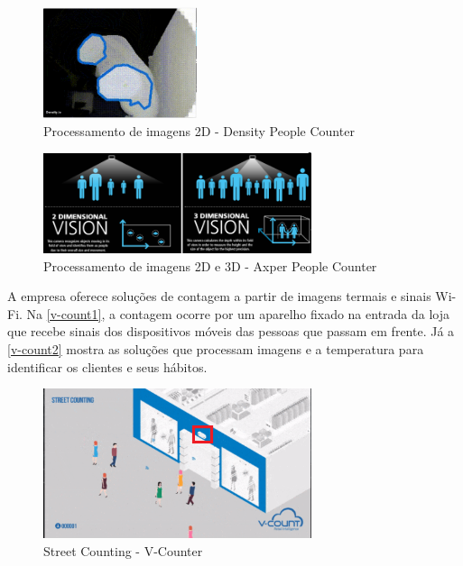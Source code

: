 \begin{figure}[htb]
  \caption{\label{density}Processamento de imagens 2D - Density People Counter}
  \begin{center}
    \includegraphics[width=0.40\textwidth]{img/density.png}
  \end{center}
\end{figure}

\begin{figure}[htb]
  \caption{\label{axper}Processamento de imagens 2D e 3D - Axper People Counter}
  \begin{center}
    \includegraphics[width=0.70\textwidth]{img/axper.png}
  \end{center}
\end{figure}

A empresa \cite{V-Count2017} oferece soluções de contagem a partir de imagens termais e sinais Wi-Fi. Na \autoref{v-count1}, a contagem ocorre por um
aparelho fixado na entrada da loja que recebe sinais dos dispositivos móveis das pessoas que passam em frente. Já a \autoref{v-count2}
mostra as soluções que processam imagens e a temperatura para identificar os clientes e seus hábitos.

\begin{figure}[htb]
  \caption{\label{v-count1}Street Counting - V-Counter}
  \begin{center}
    \includegraphics[width=0.70\textwidth]{img/v-count.png}
  \end{center}
\end{figure}

